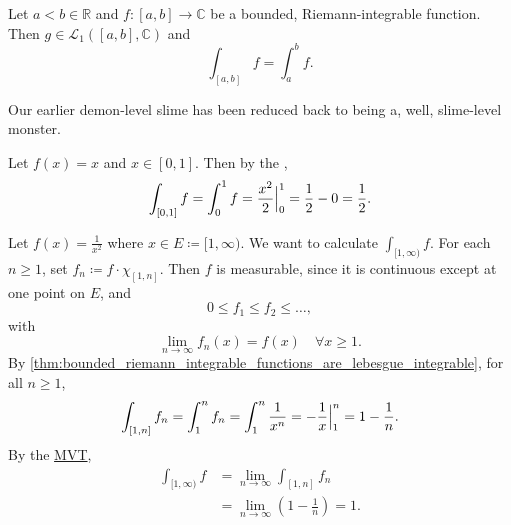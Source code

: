 \documentclass[notoc,notitlepage]{tufte-book}
\begin{document}
\begin{crly}\label{crly:bounded_riemann_integrable_functions_are_lebesgue_integrable_complex_version}
  Let $a < b \in \mathbb{R}$ and $f : [a, b] \to \mathbb{C}$ be a bounded,
  Riemann-integrable function.
  Then $g \in \mathcal{L}_1([a, b], \mathbb{C})$ and
  \begin{equation*}
    \int_{[a, b]} f = \int_{a}^{b} f.
  \end{equation*}
\end{crly}

Our earlier demon-level slime has been reduced back to being a, well,
slime-level monster.

\begin{eg}
  Let $f(x) = x$ and $x \in [0, 1]$. Then by the ,
  \begin{equation*}
    \int_{[0, 1]} f = \int_{0}^{1} f = \frac{x^2}{2} \Big|_{0}^{1} = \frac{1}{2} - 0
    = \frac{1}{2}.
  \end{equation*}
\end{eg}

\begin{eg}
  Let $f(x) = \frac{1}{x^2}$ where $x \in E \coloneqq [1, \infty)$. We want to
  calculate $\int_{[1, \infty)} f$. For each $n \geq 1$, set $f_n \coloneqq f
  \cdot \chi_{[1, n]}$. Then $f$ is measurable, since it is
  continuous except at one point on $E$, and
  \begin{equation*}
    0 \leq f_1 \leq f_2 \leq \hdots,
  \end{equation*}
  with
  \begin{equation*}
    \lim_{n \to \infty} f_n(x) = f(x) \quad \forall x \geq 1.
  \end{equation*}
  By \cref{thm:bounded_riemann_integrable_functions_are_lebesgue_integrable},
  for all $n \geq 1$,
  \begin{equation*}
    \int_{[1, n]} f_n = \int_{1}^{n} f_n = \int_{1}^{n} \frac{1}{x^n} =
    -\frac{1}{x} \Big|_{1}^{n} = 1 - \frac{1}{n}.
  \end{equation*}
  By the \hyperref[thm:the_monotone_convergence_theorem]{MVT},
  \begin{align*}
    \int_{[1, \infty)} f
    &= \lim_{n \to \infty} \int_{[1, n]} f_n \\
    &= \lim_{n \to \infty} \left( 1 - \frac{1}{n} \right) = 1.
  \end{align*}
\end{eg}
\end{document}
